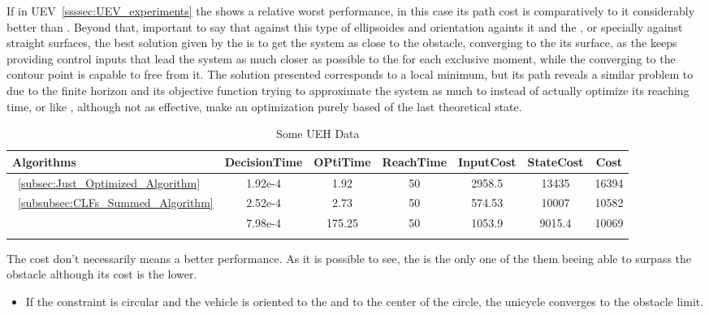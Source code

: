 If in UEV~\ref{ssssec:UEV_experiments} the  shows a relative worst performance, in this case its path cost is comparatively to it considerably better than . Beyond that, important to say that against this type of ellipsoides and orientation againts it and the \txtref, or specially against straight surfaces, the best solution given by the  is to get the system as close to the obstacle, converging to the its surface, as the  keeps providing control inputs that lead the system as much closer as possible to the \txtref for each exclusive moment, while the  converging to the contour point is capable to free from it. The  solution presented corresponds to a local minimum, but its path reveals a similar problem to  due to the finite horizon and its objective function trying to approximate the system as much to \txtref instead of actually optimize its reaching time, or like , although not as effective, make an optimization purely based of the last theoretical state.  


  \bgroup
 \begin{xltabular}{\textwidth}{|l|cccccc|}
   \toprule
   Algorithms   & DecisionTime & OPtiTime & ReachTime  & InputCost   & StateCost & Cost           \\
   \midrule
    ~\ref{subsec:Just_Optimized_Algorithm}           & 1.92e-4 & 1.92 & 50 & 2958.5 & 13435  & 16394 \\
    ~\ref{subsubsec:CLFs_Summed_Algorithm}        & 2.52e-4 & 2.73 & 50 & 574.53 & 10007 & 10582  \\
                                                      & 7.98e-4 & 175.25  & 50  & 1053.9  & 9015.4 & 10069 \\
    \midrule
    \caption{Some UEH Data}
    \label{tab:Some_UEH_Data}\\
   \end{xltabular}
 \egroup


 The cost don't necessarily means a better performance. As it is possible to see, the  is the only one of the them beeing able to surpass the obstacle although its cost is the lower.

\begin{tcolorbox}[colback=blue!5!white,colframe=blue!35!white,title=Notes:]
\begin{itemize}
    \item If the constraint is circular and the vehicle is oriented to the \txtref and to the center of the circle, the unicycle converges to the obstacle limit.
  \end{itemize}
\end{tcolorbox} 

